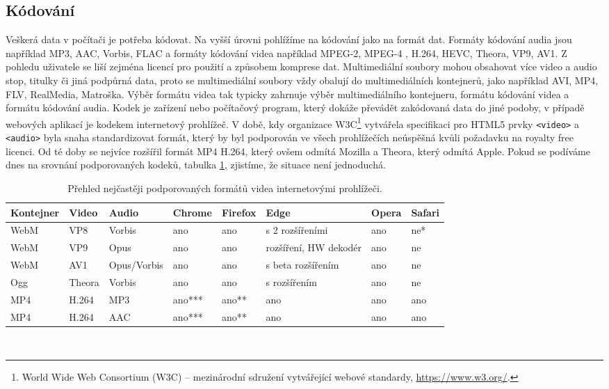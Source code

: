 \subsection{Kódování}
Veškerá data v počítači je potřeba kódovat. Na vyšší úrovni pohlížíme na kódování jako na formát dat. Formáty kódování audia  jsou například MP3, AAC, Vorbis, FLAC a formáty kódování videa například MPEG-2, MPEG-4 , H.264, HEVC, Theora, VP9, AV1.  Z pohledu uživatele se liší zejména licencí pro použití a způsobem komprese dat. Multimediální soubory mohou obsahovat více video a audio stop, titulky či jiná podpůrná data, proto se multimediální soubory vždy obalují do multimediálních kontejnerů, jako například AVI, MP4, FLV, RealMedia, Matroška. Výběr formátu videa tak typicky zahrnuje výběr multimediálního kontejneru, formátu kódování videa a formátu kódování audia. Kodek je zařízení nebo počítačový program, který dokáže převádět zakódovaná data do jiné podoby, v případě webových aplikací je kodekem internetový prohlížeč. V době, kdy organizace W3C\footnote{World Wide Web Consortium (W3C) -- mezinárodní sdružení vytvářející webové standardy, \url{https://www.w3.org/}.} vytvářela specifikaci pro HTML5 prvky \texttt{<video>} a \texttt{<audio>} byla snaha standardizovat formát, který by byl podporován ve všech prohlížečích neúspěšná kvůli požadavku na royalty free licenci.\cite{HTML5multimedia} Od té doby se nejvíce rozšířil formát MP4 H.264, který ovšem odmítá Mozilla a Theora, který odmítá Apple. Pokud se podíváme dnes na srovnání podporovaných kodeků, tabulka \ref{tab:codecs}, zjistíme, že situace není jednoduchá.
\begin{table}[h]
    \centering
    \begin{tabular}{|l|l|l||l|l|l|l|l|}
    \hline
    Kontejner   & Video & Audio & Chrome & Firefox & Edge & Opera & Safari \\
    \hline
    WebM        & VP8   & Vorbis &ano & ano & s 2 rozšířeními & ano & ne* \\
    WebM        & VP9   & Opus & ano & ano & rozšíření, HW dekodér & ano & ne \\
    WebM        & AV1   & Opus/Vorbis & ano & ano & s beta rozšířením & ano & ne \\
    Ogg         & Theora & Vorbis & ano & ano & s rozšířením & ano & ne \\
    MP4         & H.264 & MP3 & ano*** & ano** & ano & ano & ano \\
    MP4         & H.264 & AAC & ano*** & ano** & ano & ano & ano \\
    \hline
    \end{tabular}
    \caption{Přehled nejčastěji podporovaných formátů videa internetovými prohlížeči.}
    \label{tab:codecs}
\end{table}\\
